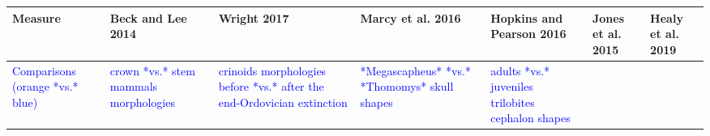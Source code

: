 \documentclass[]{article}
\begin{document}
\renewcommand\baselinestretch{1}\selectfont

\begin{longtable}[]{@{}lllllll@{}}
\toprule
\begin{minipage}[b]{0.09\columnwidth}\raggedright\strut
Measure\strut
\end{minipage} & \begin{minipage}[b]{0.11\columnwidth}\raggedright\strut
Beck and Lee 2014\strut
\end{minipage} & \begin{minipage}[b]{0.12\columnwidth}\raggedright\strut
Wright 2017\strut
\end{minipage} & \begin{minipage}[b]{0.13\columnwidth}\raggedright\strut
Marcy et al. 2016\strut
\end{minipage} & \begin{minipage}[b]{0.11\columnwidth}\raggedright\strut
Hopkins and Pearson 2016\strut
\end{minipage} & \begin{minipage}[b]{0.13\columnwidth}\raggedright\strut
Jones et al. 2015\strut
\end{minipage} & \begin{minipage}[b]{0.11\columnwidth}\raggedright\strut
Healy et al. 2019\strut
\end{minipage}\tabularnewline
\midrule
\endhead
\begin{minipage}[t]{0.09\columnwidth}\raggedright\strut
\textcolor{blue}{Comparisons (orange *vs.* blue)}\strut
\end{minipage} & \begin{minipage}[t]{0.11\columnwidth}\raggedright\strut
\textcolor{blue}{crown *vs.* stem mammals morphologies}\strut
\end{minipage} & \begin{minipage}[t]{0.12\columnwidth}\raggedright\strut
\textcolor{blue}{crinoids morphologies before *vs.* after the end-Ordovician extinction}\strut
\end{minipage} & \begin{minipage}[t]{0.13\columnwidth}\raggedright\strut
\textcolor{blue}{*Megascapheus* *vs.* *Thomomys* skull shapes}\strut
\end{minipage} & \begin{minipage}[t]{0.11\columnwidth}\raggedright\strut
\textcolor{blue}{adults *vs.* juveniles trilobites cephalon shapes}\strut
\end{minipage} & \begin{minipage}[t]{0.13\columnwidth}\raggedright\strut

\end{minipage}
\end{longtable}
\end{document}
